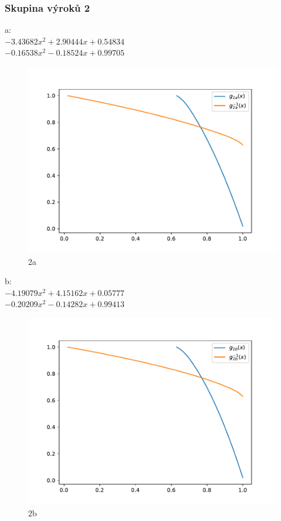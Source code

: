 \subsubsection{Skupina výrok\r u 2}
a:\\
$-3.43682x^2+2.90444x+0.54834$\\
$-0.16538x^2-0.18524x+0.99705$\\

\begin{figure}[H]
    \caption{2a}
        \hspace{-1cm}
        \includegraphics[scale=0.5]{template-fig/p2.pdf}
        \centering
\end{figure}
b:\\
$-4.19079x^2+4.15162x+0.05777$\\
$-0.20209x^2-0.14282x+0.99413$
\begin{figure}[H]
    \caption{2b}
        \hspace{-1cm}
        \includegraphics[scale=0.5]{template-fig/p3.pdf}
        \centering
\end{figure}
